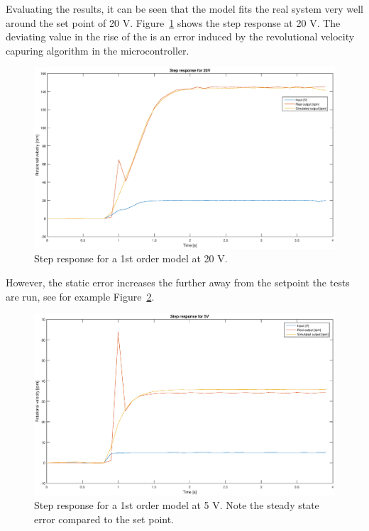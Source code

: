 Evaluating the results, it can be seen that the model fits the real system very
well around the set point of 20 V. Figure~\ref{fig:1storder_20} shows the step
response at 20 V. The deviating value in the rise of the is an error induced by
the revolutional velocity capuring algorithm in the microcontroller.
\begin{figure}[H]
    \centering
    \includegraphics[width=\textwidth]{./img/testrig_20Vstep_no_i_no_fric.eps}
    \caption{Step response for a 1st order model at 20 V.}\label{fig:1storder_20}
\end{figure}
However, the static error increases the further away from the setpoint the tests
are run, see for example Figure~\ref{fig:1storder_5}.
\begin{figure}[H]
    \centering
    \includegraphics[width=\textwidth]{./img/testrig_5Vstep_no_i_no_fric.eps}
    \caption{Step response for a 1st order model at 5 V. Note the steady state
    error compared to the set point.}\label{fig:1storder_5}
\end{figure}
